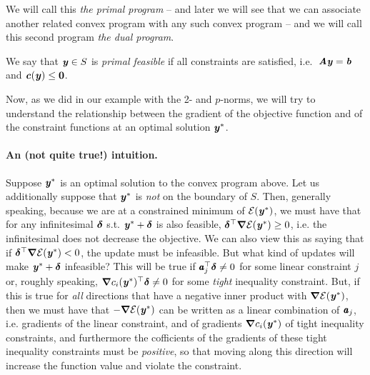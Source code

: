We will call this \emph{the primal program} -- and later we will see
that we can associate another related convex program with any such
convex program -- and we will call this second program \emph{the dual program}.

\begin{definition}
We say that $\yy \in S$ is \emph{primal feasible} if all constraints are satisfied, i.e.~$\AA\yy = \bb$ and $\cc(\yy) \leq \veczero$.
\end{definition}

Now, as we did in our example with the 2- and $p$-norms, we will try
to understand the relationship between the gradient of the objective
function and of the constraint functions at an optimal solution $\yy^*$.

\paragraph{An (not quite true!) intuition.}
Suppose $\yy^*$ is an optimal solution to the convex program above.
Let us additionally suppose that $\yy^*$ is \emph{not} on the boundary
of $S$.
Then, generally speaking, because we are at a constrained minimum of
$\energy(\yy^*)$, we must have that for any infinitesimal $\ddelta$
s.t. $\yy^*+\ddelta$ is also feasible, $\ddelta^{\top} \grad
\energy(\yy^*) \geq 0$, i.e. the infinitesimal does not decrease the
objective.
We can also view this as saying that if $\ddelta^{\top} \grad
\energy(\yy^*)  < 0$, the update must be infeasible.
But what kind of updates will make $\yy^*+\ddelta$ infeasible?
This will be true if $\aa_j^{\top} \ddelta \neq 0$ for some linear
constraint $j$ or, roughly speaking, $\grad c_i(\yy^*)^{\top} \ddelta \neq 0$ for some
\emph{tight} inequality constraint.
But, if this is true for \emph{all} directions that have a negative
inner product with $\grad \energy(\yy^*)$, then we must have that
$-\grad \energy(\yy^*)$ can be written as a linear combination of
$\aa_j$, i.e. gradients of the linear constraint, and of
gradients $\grad c_i(\yy^*)$ of tight inequality constraints,
and furthermore the cofficients of the gradients of these tight
inequality constraints must be \emph{positive}, so that moving along
this direction will increase the function value and violate the constraint. 

